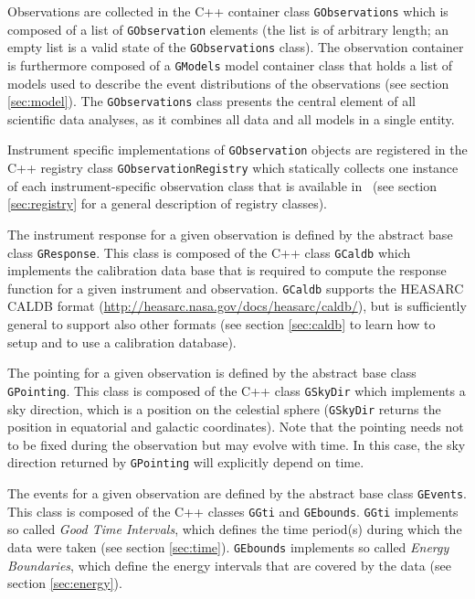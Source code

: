 \documentclass{article}[12pt,a4]
\begin{document}
Observations are collected in the C++ container class {\tt GObservations} which is composed
of a list of {\tt GObservation} elements (the list is of arbitrary length; an empty list is a valid state 
of the {\tt GObservations} class).
The observation container is furthermore composed of a {\tt GModels} model container class
that holds a list of models used to describe the event distributions of the observations 
(see section \ref{sec:model}).
The {\tt GObservations} class presents the central element of all scientific data analyses,
as it combines all data and all models in a single entity.

Instrument specific implementations of {\tt GObservation} objects are registered in the 
C++ registry class {\tt GObservationRegistry} which statically collects one instance of each 
instrument-specific observation class that is available in \this\ (see section \ref{sec:registry}
for a general description of registry classes).

The instrument response for a given observation is defined by the abstract base class 
{\tt GResponse}.
This class is composed of the C++ class {\tt GCaldb} which implements the calibration data
base that is required to compute the response function for a given instrument and observation.
{\tt GCaldb} supports the HEASARC CALDB format 
(\url{http://heasarc.nasa.gov/docs/heasarc/caldb/}), but is sufficiently general to support also
other formats (see section \ref{sec:caldb} to learn how to setup and to use a calibration database).

The pointing for a given observation is defined by the abstract base class {\tt GPointing}.
This class is composed of the C++ class {\tt GSkyDir} which implements a sky direction,
which is a position on the celestial sphere ({\tt GSkyDir} returns the position in equatorial
and galactic coordinates).
Note that the pointing needs not to be fixed during the observation but may evolve with time.
In this case, the sky direction returned by  {\tt GPointing} will explicitly depend on time.

The events for a given observation are defined by the abstract base class {\tt GEvents}.
This class is composed of the C++ classes {\tt GGti} and {\tt GEbounds}.
{\tt GGti} implements so called {\em Good Time Intervals}, which defines the time period(s)
during which the data were taken (see section \ref{sec:time}).
{\tt GEbounds} implements so called {\em Energy Boundaries}, which define the energy
intervals that are covered by the data (see section \ref{sec:energy}).
\end{document}
